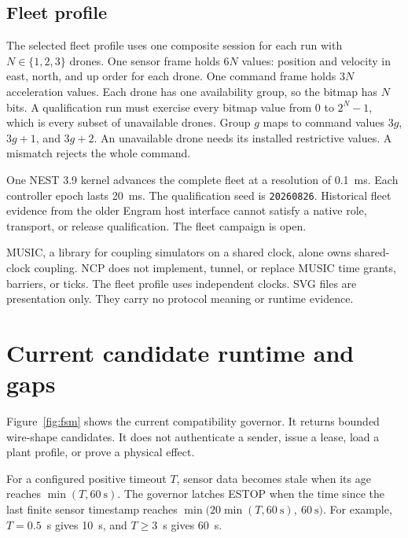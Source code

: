 \documentclass[11pt,a4paper]{article}
\theoremstyle{definition}
\let\NcpTextttBase\texttt
\renewcommand{\texttt}[1]{\mbox{\NcpTextttBase{#1}}}
\begin{document}
\subsection{Fleet profile}

The selected fleet profile uses one composite session for each run with $N\in\{1,2,3\}$
drones. One sensor frame holds $6N$ values: position and velocity in east, north, and
up order for each drone. One command frame holds $3N$ acceleration values. Each drone
has one availability group, so the bitmap has $N$ bits. A qualification run must
exercise every bitmap value from 0 to $2^N-1$, which is every subset of unavailable
drones. Group $g$ maps to command values $3g$, $3g+1$, and $3g+2$. An
unavailable drone needs its installed restrictive values. A mismatch rejects the whole
command.

One NEST 3.9 kernel advances the complete fleet at a resolution of 0.1~ms. Each
controller epoch lasts 20~ms. The qualification seed is \texttt{20260826}. Historical
fleet evidence from the older Engram host interface cannot satisfy a native role,
transport, or release qualification. The fleet campaign is open.

MUSIC, a library for coupling simulators on a shared clock, alone owns shared-clock
coupling. NCP does not implement, tunnel, or replace MUSIC time grants, barriers, or
ticks. The fleet profile uses independent clocks. SVG files are presentation only. They
carry no protocol meaning or runtime evidence.

\section{Current candidate runtime and gaps}\label{sec:gaps}


Figure~\ref{fig:fsm} shows the current compatibility governor. It returns bounded
wire-shape candidates. It does not authenticate a sender, issue a lease, load a plant
profile, or prove a physical effect.

For a configured positive timeout $T$, sensor data becomes stale when its age reaches
$\min(T,60\ \mathrm{s})$. The governor latches ESTOP when the time since the last finite
sensor timestamp reaches $\min\bigl(20\min(T,60\ \mathrm{s}),\ 60\ \mathrm{s}\bigr)$. For example, $T=0.5$~s gives 10~s, and $T\geq3$~s gives 60~s.
\end{document}
